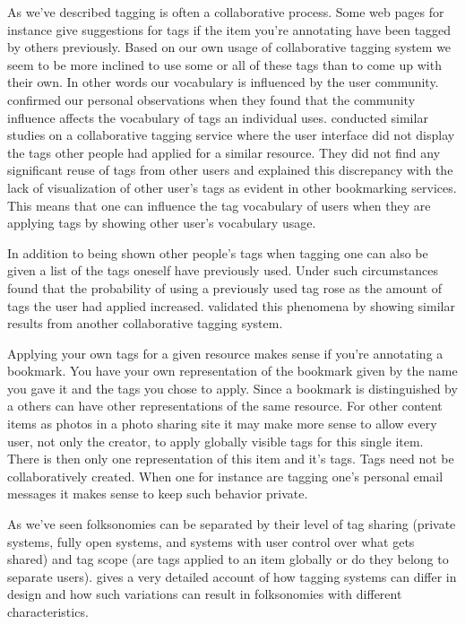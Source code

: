 As we've described tagging is often a collaborative process. Some web pages
for instance give suggestions for tags if the item you're annotating have
been tagged by others previously. Based on our own usage of collaborative
tagging system we seem to be more inclined to use some or all of these tags
than to come up with their own. In other words our vocabulary is influenced
by the user community. \citet[]{sen06} confirmed our personal
observations when they found that the community influence affects the
vocabulary of tags an individual uses. \citet[]{farooq07} conducted
similar studies on a collaborative tagging service where the user interface
did not display the tags other people had applied for a similar resource.
They did not find any significant reuse of tags from other users and explained
this discrepancy with the lack of visualization of other user's tags as
evident in other bookmarking services. This means that one can influence
the tag vocabulary of users when they are applying tags by showing other
user's vocabulary usage.

In addition to being shown other people's tags when tagging one can also
be given a list of the tags oneself have previously used.
Under such circumstances \citet[]{sen06} found that the probability
of using a previously used tag rose as the amount of tags the user had
applied increased. \citet[]{farooq07} validated this phenomena
by showing similar results from another collaborative tagging system.

Applying your own tags for a given resource makes sense if you're annotating a
bookmark. You have your own representation of the bookmark given by the name
you gave it and the tags you chose to apply. Since a bookmark is distinguished
by a  others can have other representations of the same resource.
For other content items as photos in a photo sharing site it may make more
sense to allow every user, not only the creator, to apply globally visible
tags for this single item. There is then only one representation of this item
and it's tags.
Tags need not be collaboratively created. When one for instance are tagging
one's personal email messages it makes sense to keep such behavior private.

As we've seen folksonomies can be separated by their level of tag sharing
(private systems, fully open systems, and systems with user control over
what gets shared) and tag scope (are tags applied to an item globally
or do they belong to separate users).
\citet[]{marlow06} gives a very detailed account of how tagging
systems can differ in design and how such variations can result in
folksonomies with different characteristics.

